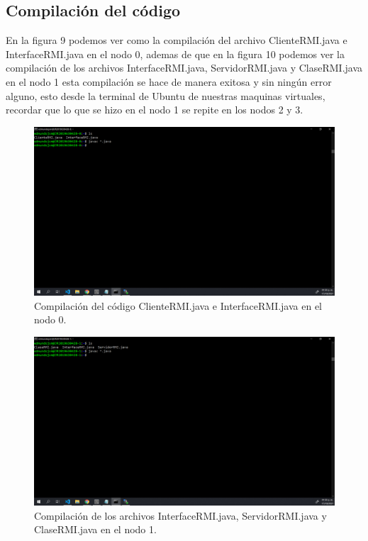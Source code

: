 \documentclass[11pt]{article}
\begin{document}
		\subsection{Compilación del código}
		En la figura 9 podemos ver como la compilación del archivo ClienteRMI.java e InterfaceRMI.java en el nodo 0, ademas de que en la figura 10 podemos ver la compilación de los archivos  InterfaceRMI.java, ServidorRMI.java y ClaseRMI.java en el nodo 1 esta compilación se hace de manera exitosa y sin ningún error alguno, esto desde la terminal de Ubuntu de nuestras maquinas virtuales, recordar que lo que se hizo en el nodo 1 se repite en los nodos 2 y 3.
		\begin{figure}[H]
			\centering
			\includegraphics[scale=0.34]{resources/compilacionClienteInterface.png}
				\caption{Compilación del código ClienteRMI.java e InterfaceRMI.java en el nodo 0. }					\label{fig:picture}
		\end{figure}
		
		\begin{figure}[H]
			\centering
			\includegraphics[scale=0.34]{resources/compilacionlodemasxd.png}
				\caption{Compilación de los archivos  InterfaceRMI.java, ServidorRMI.java y ClaseRMI.java en el nodo 1.}					\label{fig:picture}
		\end{figure}
\end{document}
